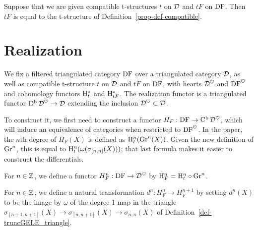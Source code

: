 \begin{proposition}
\label{prop-compatible-uniq}
\leanok
{}
Suppose that we are given compatible t-structures $t$ on $\mathcal{D}$ and $tF$ on $\operatorname{DF}$. Then $tF$ is equal to the
t-structure of Definition~\ref{prop-def-compatible}.

\end{proposition}


\section{Realization}

We fix a filtered triangulated category $\operatorname{DF}$ over a triangulated category $\mathcal{D}$, as well
as compatible t-structure $t$ on $\mathcal{D}$ and $tF$ on $\operatorname{DF}$, with hearts $\mathcal{D}^\heartsuit$ and
$\operatorname{DF}^\heartsuit$ and cohomology functors $\mathrm{H}^*_t$ and $\mathrm{H}^*_{tF}$. The realization functor is a 
triangulated functor $\operatorname{\mathrm{D}^b} \mathcal{D}^\heartsuit\to\mathcal{D}$ extending the inclusion $\mathcal{D}^\heartsuit\subset\mathcal{D}$.

To construct it, we first need to construct a functor $H_F : \operatorname{DF} \to \operatorname{\mathrm{C}^b} \mathcal{D}^\heartsuit$, which
will induce an equivalence of categories when restricted to $\operatorname{DF}^\heartsuit$.
In the paper, the $n$th degree of $H_F(X)$ is defined as $\mathrm{H}^n_t(\operatorname{Gr}^n(X))$.
Given the new definition of $\operatorname{Gr}^n$, this is equal to $\mathrm{H}^n_t(\omega(\sigma_{[n,n]}(X)))$;
that last formula makes it easier to construct the differentials.

\begin{definition}
\label{def-HF-deg}
\leanok
{}
For $n\in\mathbb{Z}$, we define a functor $H_F^n:\operatorname{DF}\to \mathcal{D}^\heartsuit$ by 
$\mathrm{H}_F^n=\mathrm{H}^n_t\circ\operatorname{Gr}^n$.

\end{definition}

\begin{definition}
\label{def-HF-diff}
\leanok
{}
For $n\in\mathbb{Z}$, we define a natural transformation $d^n : H_F^n\to H_F^{n+1}$ by
setting $d^n(X)$ to be the image by $\omega$ of the degree $1$ map in the
triangle $\sigma_{[n+1,n+1]}(X)\to\sigma_{[n,n+1]}(X)\to\sigma_{{n,n}}(X)$
of Definition~\ref{def-truncGELE_triangle}.

\end{definition}

